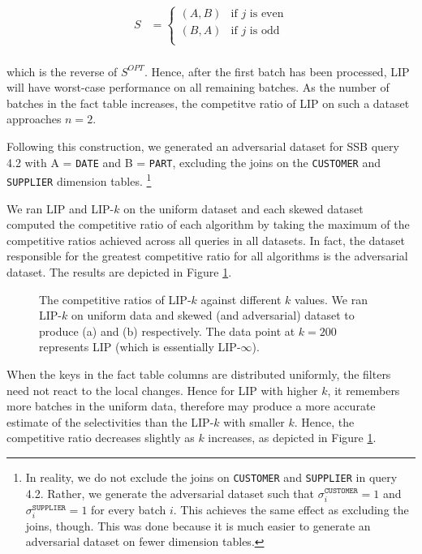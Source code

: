 \begin{align*}
S &= 
    \begin{cases}
    (A, B) & \text{if $j$ is even} \\[0.5em]
    (B, A) & \text{if $j$ is odd} \\
    \end{cases}\\[0.5em]
\end{align*}

which is the reverse of $S^{OPT}$. 
Hence, after the first batch has been processed, LIP will have worst-case performance on all remaining batches. 
As the number of batches in the fact table increases, the competitve ratio of LIP on such a dataset approaches $n =2$.

Following this construction, we generated an adversarial dataset for SSB query 4.2 with A = \texttt{DATE} and B = \texttt{PART},
excluding the joins on the \texttt{CUSTOMER} and \texttt{SUPPLIER} dimension tables.
\footnote{In reality, we do not exclude the joins on \texttt{CUSTOMER} and \texttt{SUPPLIER} in query 4.2. 
Rather, we generate the adversarial dataset such that $\sigma_i^{\texttt{CUSTOMER}}=1$ and $\sigma_i^{\texttt{SUPPLIER}}=1$ for every batch $i$. 
This achieves the same effect as excluding the joins, though. 
This was done because it is much easier to generate an adversarial dataset on fewer dimension tables.}



We ran LIP and LIP-$k$ on the uniform dataset and each skewed dataset computed the competitive ratio of each algorithm by taking the maximum of the competitive ratios achieved across all queries in all datasets. In fact, the dataset responsible for the greatest competitive ratio for all algorithms is the adversarial dataset.  The results are depicted in Figure \ref{fig:cr}. 

\begin{figure}
    \centering
    \quad
    \caption{The competitive ratios of LIP-$k$ against different $k$ values. We ran LIP-$k$ on uniform data and skewed (and adversarial) dataset to produce (a) and (b) respectively. The data point at $k = 200$ represents LIP (which is essentially LIP-$\infty$).}
    \label{fig:cr}
\end{figure}

When the keys in the fact table columns are distributed uniformly, the filters need not react to the local changes. Hence for LIP with higher $k$, it remembers more batches in the uniform data, therefore may produce a more accurate estimate of the selectivities than the LIP-$k$ with smaller $k$. Hence, the competitive ratio decreases slightly as $k$ increases, as depicted in Figure \ref{fig:cr}.


